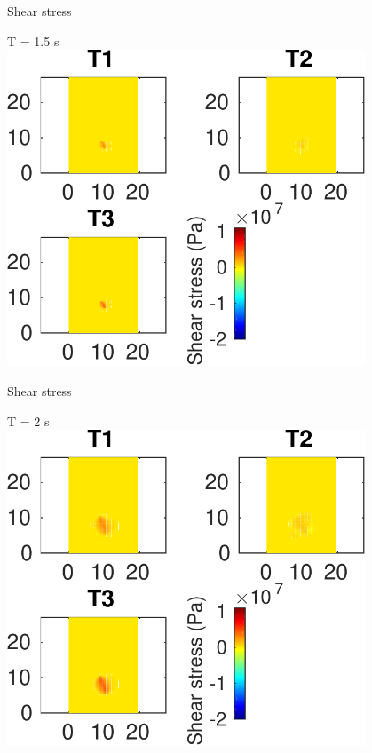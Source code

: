 \documentclass{beamer}
\begin{document}
\begin{frame}
 {Shear stress}
 
 \centering \Large T = 1.5 s\\
 \includegraphics[width=0.8\textwidth]{images/horizontal_00021}
 
\end{frame}

\begin{frame}
 {Shear stress}
 
 \centering \Large T = 2 s\\
 \includegraphics[width=0.8\textwidth]{images/horizontal_00026}
 
\end{frame}
\end{document}
